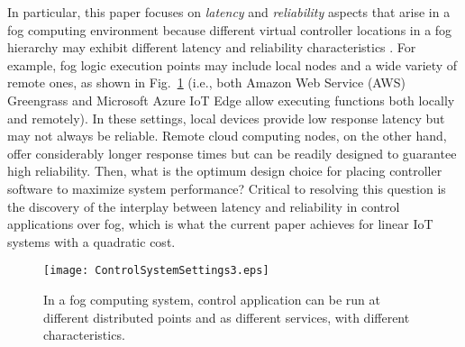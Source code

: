 \documentclass[10pt, journal, letterpaper]{IEEEtran}
\newcommand{\1}{\ensuremath{\mathbf{1}}} %
\begin{document}

In particular, this paper focuses on \emph{latency} and {\em reliability} aspects that arise in a fog computing environment because different virtual controller locations in a fog hierarchy may exhibit different latency and reliability characteristics \cite{Chiang2016Fog}. For example, fog logic execution points may include local nodes and a wide variety of remote ones, as shown in Fig.~\ref{fig:FogFabic} (i.e., both Amazon Web Service (AWS) Greengrass \cite{AmazonGreenGrass}
and Microsoft Azure IoT Edge \cite{AzureEdge2017}
allow executing functions both locally and remotely). In these settings, local devices provide low response latency but may not always be reliable. Remote cloud computing nodes, on the other hand, offer considerably longer response times \cite{Gao2015Cloudlets} but can be readily designed to guarantee high reliability.
Then, what is the optimum design choice for placing controller software to maximize system performance? Critical to resolving this question is the discovery of the interplay between latency and reliability in control applications over fog, which is what the current paper achieves for linear IoT systems with a  quadratic cost.

\begin{figure}[t]
  \centering
  \texttt{[image: ControlSystemSettings3.eps]}
 \vspace{-0.2cm}
  \caption{In a fog computing system, control application can be run at different distributed points and as different services, with different characteristics.\label{fig:FogFabic}}
  \vspace{-0.0cm}
\end{figure} %
\end{document}
